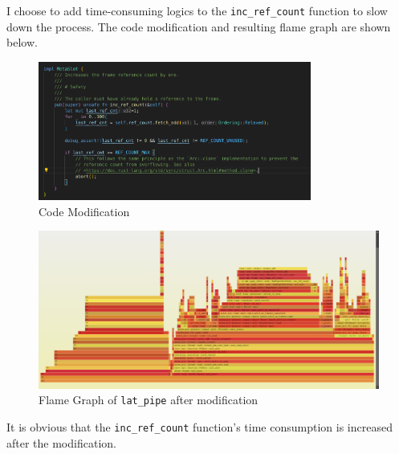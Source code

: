 \documentclass[a4paper,12pt]{article}
\begin{document}
I choose to add time-consuming logics to the \texttt{inc\_ref\_count} function to slow down the process. The code modification and resulting flame graph are shown below.

\begin{figure}[H]
	\centering
	\includegraphics[width=0.8\textwidth]{figure/code.png}
	\caption{Code Modification}
\end{figure}

\begin{figure}[H]
	\centering
	\includegraphics[width=\textwidth]{figure/after.png}
	\caption{Flame Graph of \texttt{lat\_pipe} after modification}
\end{figure}

It is obvious that the \texttt{inc\_ref\_count} function's time consumption is increased after the modification. 
\end{document}
